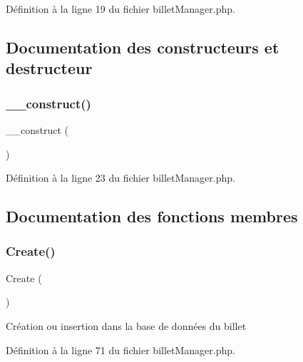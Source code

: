 Définition à la ligne 19 du fichier billet\+Manager.\+php.



\subsection{Documentation des constructeurs et destructeur}
\mbox{\label{class_src_1_1_managers_1_1billet_manager_a095c5d389db211932136b53f25f39685}} 
\subsubsection{\texorpdfstring{\+\_\+\+\_\+construct()}{\_\_construct()}}
{\footnotesize\ttfamily \+\_\+\+\_\+construct (\begin{DoxyParamCaption}{ }\end{DoxyParamCaption})}



Définition à la ligne 23 du fichier billet\+Manager.\+php.



\subsection{Documentation des fonctions membres}
\mbox{\label{class_src_1_1_managers_1_1billet_manager_ad01f71fa0ecc039494e3c282864298c3}} 
\subsubsection{\texorpdfstring{Create()}{Create()}}
{\footnotesize\ttfamily Create (\begin{DoxyParamCaption}{ }\end{DoxyParamCaption})}

Création ou insertion dans la base de données du billet 

Définition à la ligne 71 du fichier billet\+Manager.\+php.

